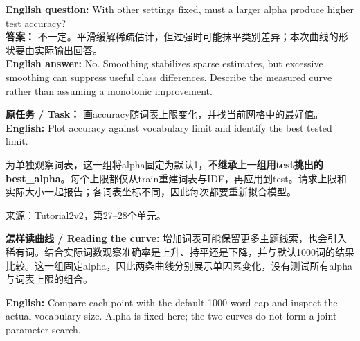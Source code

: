 \textbf{English question:} With other settings fixed, must a larger alpha produce higher test accuracy?\\

\textbf{答案：} 不一定。平滑缓解稀疏估计，但过强时可能抹平类别差异；本次曲线的形状要由实际输出回答。\\

\textbf{English answer:} No. Smoothing stabilizes sparse estimates, but excessive smoothing can suppress useful class differences. Describe the measured curve rather than assuming a monotonic improvement.







\textbf{原任务 / Task：} 画accuracy随词表上限变化，并找当前网格中的最好值。\\

\textbf{English:} Plot accuracy against vocabulary limit and identify the best tested limit.


为单独观察词表，这一组将alpha固定为默认1，\textbf{不继承上一组用test挑出的best\_alpha}。每个上限都仅从train重建词表与IDF，再应用到test。请求上限和实际大小一起报告；各词表坐标不同，因此每次都要重新拟合模型。


来源：Tutorial2v2，第27–28个单元。








\textbf{怎样读曲线 / Reading the curve:} 增加词表可能保留更多主题线索，也会引入稀有词。结合实际词数观察准确率是上升、持平还是下降，并与默认1000词的结果比较。这一组固定alpha，因此两条曲线分别展示单因素变化，没有测试所有alpha与词表上限的组合。


\textbf{English:} Compare each point with the default 1000-word cap and inspect the actual vocabulary size. Alpha is fixed here; the two curves do not form a joint parameter search.







